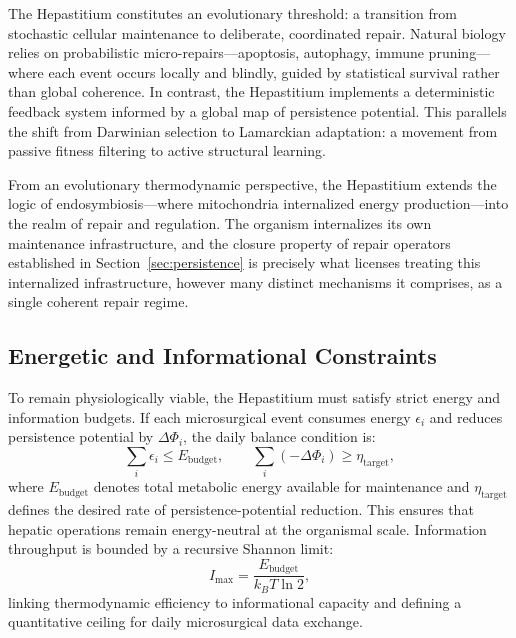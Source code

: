 \documentclass[12pt]{article}
\begin{document}
The Hepastitium constitutes an evolutionary threshold: a transition from stochastic cellular maintenance to deliberate, coordinated repair. Natural biology relies on probabilistic micro-repairs---apoptosis, autophagy, immune pruning---where each event occurs locally and blindly, guided by statistical survival rather than global coherence. In contrast, the Hepastitium implements a deterministic feedback system informed by a global map of persistence potential. This parallels the shift from Darwinian selection to Lamarckian adaptation: a movement from passive fitness filtering to active structural learning.

From an evolutionary thermodynamic perspective, the Hepastitium extends the logic of endosymbiosis---where mitochondria internalized energy production---into the realm of repair and regulation. The organism internalizes its own maintenance infrastructure, and the closure property of repair operators established in Section~\ref{sec:persistence} is precisely what licenses treating this internalized infrastructure, however many distinct mechanisms it comprises, as a single coherent repair regime.

\subsection{Energetic and Informational Constraints}

To remain physiologically viable, the Hepastitium must satisfy strict energy and information budgets. If each microsurgical event consumes energy $\epsilon_i$ and reduces persistence potential by $\Delta\Phi_i$, the daily balance condition is:
\begin{equation}
\sum_i \epsilon_i \le E_{\text{budget}}, \qquad \sum_i (-\Delta\Phi_i) \ge \eta_{\text{target}},
\label{eq:energy-budget}
\end{equation}
where $E_{\text{budget}}$ denotes total metabolic energy available for maintenance and $\eta_{\text{target}}$ defines the desired rate of persistence-potential reduction. This ensures that hepatic operations remain energy-neutral at the organismal scale. Information throughput is bounded by a recursive Shannon limit:
\begin{equation}
I_{\max} = \frac{E_{\text{budget}}}{k_B T \ln 2},
\label{eq:shannon-limit}
\end{equation}
linking thermodynamic efficiency to informational capacity and defining a quantitative ceiling for daily microsurgical data exchange.
\end{document}
